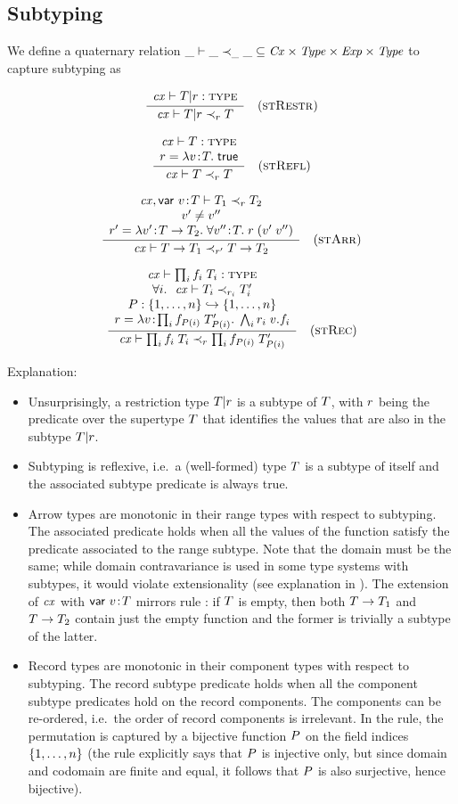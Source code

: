 \subsection{Subtyping}

We define a quaternary relation $\_\vdash\_\prec_{\_}\_\subseteq\mathit{Cx}\times\mathit{Type}\times\mathit{Exp}\times\mathit{Type}$ to
capture subtyping as

\[
\frac{\begin{array}{c}\mathit{cx}\vdash T|r:\textsc{type}\end{array}}{\mathit{cx}\vdash T|r\prec_{r}T}\quad\mbox{(\textsc{stRestr})}
\]

\[
\frac{\begin{array}{c}\mathit{cx}\vdash T:\textsc{type}\\r=\lambda v\!:\!T.\;\mathsf{true}\end{array}}{\mathit{cx}\vdash T\prec_{r}T}\quad\mbox{(\textsc{stRefl})}
\]

\[
\frac{\begin{array}{c}\mathit{cx},\mathsf{var}\ v\!:\!T\vdash T_1\prec_{r}T_2\\v'\neq v''\\r'=\lambda v'\!:\!T\to T_2.\;\forall v''\!:\!T.\;r\;(v'\;v'')\end{array}}{\mathit{cx}\vdash T\to T_1\prec_{r'}T\to T_2}\quad\mbox{(\textsc{stArr})}
\]

\[
\frac{\begin{array}{c}\mathit{cx}\vdash\prod_{i}f_i\;T_i:\textsc{type}\\\forall i.\ \ \mathit{cx}\vdash T_i\prec_{r_i}T_i'\\P:\{1,\ldots,n\}\hookrightarrow\{1,\ldots,n\}\\r=\lambda v\!:\!\prod_{i}f_{P(i)}\;T_{P(i)}'.\;\bigwedge_{i}r_i\;v.f_i\end{array}}{\mathit{cx}\vdash\prod_{i}f_i\;T_i\prec_{r}\prod_{i}f_{P(i)}\;T_{P(i)}'}\quad\mbox{(\textsc{stRec})}
\]

Explanation:
\begin{itemize}
\item
Unsurprisingly, a restriction type $T|r$ is a subtype of $T$, with
$r$ being the predicate over the supertype $T$ that identifies the
values that are also in the subtype $T|r$.
\item
Subtyping is reflexive, i.e.\ a (well-formed) type $T$ is a subtype of itself
and the associated subtype predicate is always true.
\item
Arrow types are monotonic in their range types with respect to subtyping. The
associated predicate holds when all the values of the function satisfy the
predicate associated to the range subtype. Note that the domain must be the
same; while domain contravariance is used in some type systems with subtypes, it
would violate extensionality (see explanation in \cite{pvs-seman}). The
extension of $\mathit{cx}$ with $\mathsf{var}\ v\!:\!T$ mirrors rule \Rtarr: if $T$ is empty, then
both $T\to T_1$ and $T\to T_2$ contain just the empty
function and the former is trivially a subtype of the latter.
\item
Record types are monotonic in their component types with respect to
subtyping. The record subtype predicate holds when all the component subtype
predicates hold on the record components. The components can be re-ordered,
i.e.\ the order of record components is irrelevant. In the rule, the permutation
is captured by a bijective function $P$ on the field indices $\{1,\ldots,n\}$
(the rule explicitly says that $P$ is injective only, but since domain and
codomain are finite and equal, it follows that $P$ is also surjective, hence
bijective).
\end{itemize}

